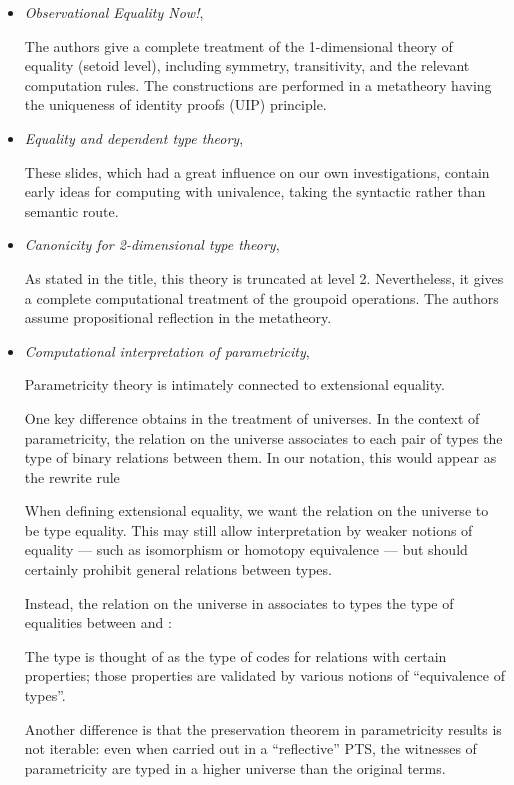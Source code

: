 \documentclass[10pt]{article}
\begin{document}
\begin{itemize}
\item 
\emph{Observational Equality Now!}, \cite{ott}

The authors give a complete treatment of the 1-dimensional theory of equality (setoid level), including symmetry, transitivity, and the relevant computation
rules.  The constructions are performed in a metatheory having
the uniqueness of identity proofs (UIP) principle.
\item 

\emph{Equality and dependent type theory}, \cite{coquand}

These slides, which had a great influence on our own investigations,
contain early ideas for computing with univalence, taking the
syntactic rather than semantic route.
\item 
\emph{Canonicity for 2-dimensional type theory}, \cite{harper}

As stated in the title, this theory is truncated at level 2.
Nevertheless, it gives a complete computational treatment
of the groupoid operations.  The authors assume propositional reflection in the metatheory.
\item 
\emph{Computational interpretation of parametricity},
\cite{intpar}

Parametricity theory is intimately connected to extensional equality.

One key difference obtains in the
treatment of universes.  In the context of parametricity, the relation on the
universe associates to each pair of types the type of binary relations
between them.  In our notation, this would appear as the rewrite rule



When defining extensional equality, we want the relation on the
universe to be type equality.  This may still allow interpretation by weaker notions of
equality --- such as isomorphism or homotopy equivalence --- but should
certainly prohibit general relations between types.

Instead, the relation on the universe in  associates to types
 the type of equalities between  and :

The type  is thought of as the type of codes for relations with
certain properties; those properties are validated by various
notions of ``equivalence of types''.

Another difference is that the preservation theorem in parametricity results
is not iterable: even when carried out in a ``reflective'' PTS, the
witnesses of parametricity are typed in a higher universe than the
original terms.


\end{itemize}
\end{document}
